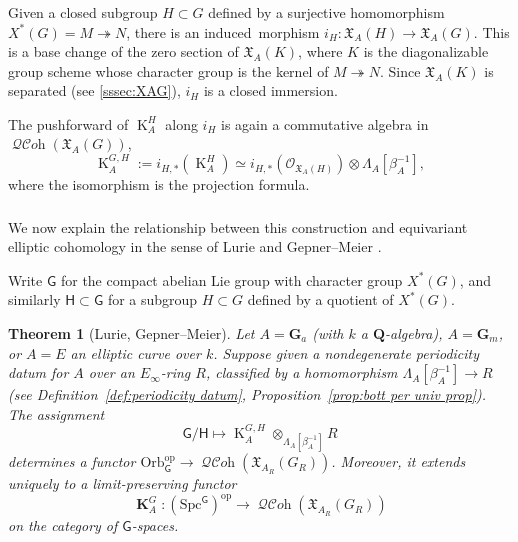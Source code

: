 \documentclass[12pt, oneside]{amsart}
\numberwithin{equation}{section}
\newtheorem{theorem}[subsubsection]{Theorem}
\theoremstyle{remark}
\theoremstyle{plain}
\DeclareMathOperator{\QCOH}{\mathcal{QC}\textit{oh}}
\newcommand{\frX}{\mathfrak{X}}
\newcommand{\lam}{\Lambda}
\newcommand{\OO}{\mathcal{O}}
\newcommand{\GGa}{\mathbf{G}_{a}}
\newcommand{\GGm}{\mathbf{G}_{m}}
\newcommand{\bQ}{\mathbf{Q}}
\newcommand{\K}{\operatorname{K}}
\newcommand{\Kcoh}{\operatorname{\mathbf{K}}}
\begin{document}
\subsubsection{}

Given a closed subgroup $H \subset G$ defined by a surjective homomorphism $X^*(G) = M \twoheadrightarrow N$, there is an induced morphism $i_H : \frX_A(H) \to \frX_A(G)$.
This is a base change of the zero section of $\frX_A(K)$, where $K$ is the diagonalizable group scheme whose character group is the kernel of $M \twoheadrightarrow N$.
Since $\frX_A(K)$ is separated (see \ref{sssec:XAG}), $i_H$ is a closed immersion.

The pushforward of $\K_A^H$ along $i_{H}$ is again a commutative algebra in $\QCOH(\frX_A(G))$,
\begin{equation}\label{eq:KAG}
  \K_A^{G,H} :=
  i_{H,*} (\K_A^H) \simeq
  i_{H,*} (\OO_{\frX_A(H)}) \otimes \lam_A[\beta_A^{-1}],
\end{equation}
where the isomorphism is the projection formula.

\subsubsection{}

We now explain the relationship between this construction and equivariant elliptic cohomology in the sense of Lurie and Gepner--Meier \cite{LurieEllSurv,GepMei}.

Write $\mathsf{G}$ for the compact abelian Lie group with character group $X^*(G)$, and similarly $\mathsf{H} \subset \mathsf{G}$ for a subgroup $H \subset G$ defined by a quotient of $X^*(G)$.

\begin{theorem}[Lurie, Gepner--Meier]\label{thm:KAG functoriality}
  Let $A=\GGa$ (with $k$ a $\bQ$-algebra), $A=\GGm$, or $A=E$ an elliptic curve over $k$.
  Suppose given a nondegenerate periodicity datum for $A$ over an $E_\infty$-ring $R$, classified by a homomorphism $\lam_A[\beta_A^{-1}] \to R$ (see Definition~\ref{def:periodicity datum}, Proposition~\ref{prop:bott per univ prop}).
  The assignment
  \[
    \mathsf{G}/\mathsf{H} \mapsto \K_A^{G,H} \otimes_{\lam_A[\beta_A^{-1}]} R
  \]
  determines a functor $\mathrm{Orb}_{\mathsf{G}}^{\mathrm{op}} \to \QCOH(\frX_{A_R}(G_R))$.
  Moreover, it extends uniquely to a limit-preserving functor
  \begin{equation}\label{eq:GM cohomology}
    \Kcoh_A^G : (\mathrm{Spc}^{\mathsf{G}})^{\mathrm{op}} \to \QCOH(\frX_{A_R}(G_R))
  \end{equation}
  on the category of $\mathsf{G}$-spaces.
\end{theorem}
\end{document}
